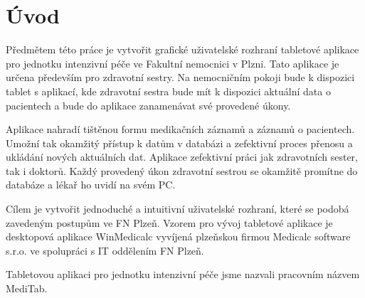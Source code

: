 \setlength{\parskip}{1em}

\chapter*{Úvod}

Předmětem této práce je vytvořit grafické uživatelské rozhraní tabletové aplikace pro jednotku intenzivní péče ve Fakultní nemocnici v Plzni. Tato aplikace je určena především pro zdravotní sestry. Na nemocničním pokoji bude k dispozici tablet s aplikací, kde zdravotní sestra bude mít k dispozici aktuální data o pacientech a bude do aplikace zanamenávat své provedené úkony.

Aplikace nahradí tištěnou formu medikačních záznamů a záznamů o pacientech. Umožní tak okamžitý přístup k datům v databázi a zefektivní proces přenosu a ukládání nových aktuálních dat. Aplikace zefektivní práci jak zdravotních sester, tak i doktorů. Každý provedený úkon zdravotní sestrou se okamžitě promítne do databáze a lékař ho uvidí na svém PC.

Cílem je vytvořit jednoduché a intuitivní uživatelské rozhraní, které se podobá zavedeným postupům ve FN Plzeň. Vzorem pro vývoj tabletové aplikace je desktopová aplikace WinMedicalc vyvíjená plzeňskou firmou Medicalc software s.r.o. ve spolupráci s IT oddělením FN Plzeň.

Tabletovou aplikaci pro jednotku intenzivní péče jsme nazvali pracovním názvem MediTab.